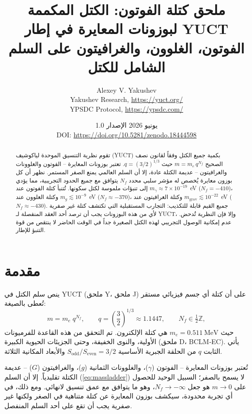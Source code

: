 \documentclass[12pt,a4paper]{article}
\title{\Huge\textbf{ملحق كتلة الفوتون: الكتل المكممة لبوزونات المعايرة في إطار YUCT}\\[0.3cm]
	\Large الفوتون، الغلوون، والغرافيتون على السلم الشامل للكتل}
\author{Alexey V. Yakushev \\ 
	Yakushev Research, \url{https://yuct.org/} \\ 
	YPSDC Protocol, \url{https://ypsdc.com/}}
\date{يونيو 2026 \quad الإصدار 1.0 \\ \medskip
	DOI: \url{https://doi.org/10.5281/zenodo.18444598}}
\begin{document}
	
	\maketitle
	
	\begin{abstract}
		تقوم نظرية التنسيق الموحدة لياكوشيف (YUCT) بكمية جميع الكتل وفقاً لقانون نصف الصحيح
		$m = m_e \, q^{N_f}$ حيث $q = (3/2)^{1/3}$. تعتبر بوزونات المعايرة – الفوتون والغلوونات والغرافيتون – عديمة الكتلة عادة،
		إلا أن السلم العالمي يمنع الصفر المستمر. نظهر أن كل بوزون معايرة يُخصص له مؤشر سلبي محدد $N_f$ يتوافق مع جميع الحدود
		التجريبية، مما يؤدي إلى تنبؤات ملموسة لكتل سكونها. تُتنبأ كتلة الفوتون عند $m_\gamma \approx 7\times 10^{-19}$~eV ($N_f = -410$)،
		وكتلة الغلوون عند $m_g \lesssim 10^{-9}$~eV ($N_f \approx -370$)، وكتلة الغرافيتون عند
		$m_{\mathrm{grav}} \lesssim 10^{-22}$~eV ($N_f \approx -430$). جميع القيم قابلة للتكذيب: التجارب المستقبلية التي تكتشف كتلة غير صفرية
		لأي من هذه البوزونات يجب أن ترصد أحد العقد المنفصلة لـ YUCT، وإلا فإن النظرية تُدحض. عدم إمكانية الوصول التجريبي لهذه الكتل
		الصغيرة جداً في الوقت الحاضر لا ينتقص من قوة التنبؤ للإطار.
	\end{abstract}
	
	\newpage
	\tableofcontents
	\newpage
	
	\section{مقدمة}
	
	ينص سلم الكتل في YUCT (ملحق Y، ملحق J) على أن كتلة أي جسم فيزيائي مستقر تُعطى بالصيغة:
	\begin{equation}\label{eq:massladder}
		m = m_e \; q^{N_f}, \qquad q = \left(\frac{3}{2}\right)^{\!1/3} \approx 1.1447,
		\qquad N_f \in \tfrac12\mathbb{Z},
	\end{equation}
	حيث $m_e = 0.511~\mathrm{MeV}$ هي كتلة الإلكترون. تم التحقق من هذه القاعدة للفرميونات الأولية،
	والنوى الخفيفة، وحتى الجزيئات الحيوية الكبيرة (ملحق D، BCLM‑EC). يأتي الثابت $q$ من الحلقة الجبرية الأساسية
	$S_{\mathrm{odd}}/S_{\mathrm{even}} = 3/2$ والأبعاد المكانية الثلاثة.
	
	تُعتبر بوزونات المعايرة – الفوتون ($\gamma$)، والغلوونات الثمانية ($g$)، والغرافيتون ($G$) – عديمة الكتلة تقليدياً.
	إلا أن السلم (\ref{eq:massladder}) لا يسمح بالصفر؛ السبيل الوحيد للحصول على $m \to 0$ هو جعل $N_f \to -\infty$،
	وهو ما يتوافق مع عمق تنسيق لانهائي. ومع ذلك، في أي تجربة محدودة، سيكشف بوزون المعايرة عن كتلة متناهية في الصغر ولكنها غير صفرية
	يجب أن تقع على أحد السلم المنفصل.
	
\end{document}
